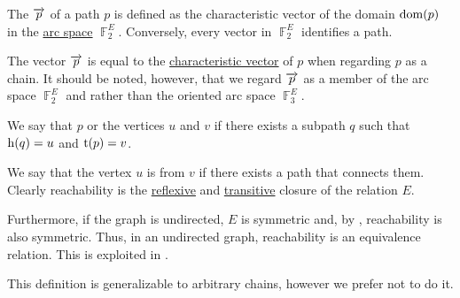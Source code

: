 \begin{definition}
\begin{thmenum}
     The  \( \overrightarrow{p} \) of a path \( p \) is defined as the characteristic vector of the domain \( \operatorname{dom}(p) \) in the \hyperref[def:graph_spaces/arc]{arc space} \( \BbbF_2^E \). Conversely, every vector in \( \BbbF_2^E \) identifies a path.

    The vector \( \overrightarrow{p} \) is equal to the \hyperref[def:graph_adjacency_chain/characteristic_vector]{characteristic vector} of \( p \) when regarding \( p \) as a chain. It should be noted, however, that we regard \( \overrightarrow{p} \) as a member of the arc space \( \BbbF_2^E \) and rather than the oriented arc space \( \BbbF_3^E \).

     We say that \( p \)  or  the vertices \( u \) and \( v \) if there exists a subpath \( q \) such that \( \operatorname{h}(q) = u \) and \( \operatorname{t}(p) = v \).

    We say that the vertex \( u \) is  from \( v \) if there exists a path that connects them. Clearly reachability is the \hyperref[def:relation_closures/reflexive]{reflexive} and \hyperref[def:relation_closures/transitive]{transitive} closure of the relation \( E \).

    Furthermore, if the graph is undirected, \( E \) is symmetric and, by , reachability is also symmetric. Thus, in an undirected graph, reachability is an equivalence relation. This is exploited in .

    This definition is generalizable to arbitrary chains, however we prefer not to do it.
  \end{thmenum}
\end{definition}

